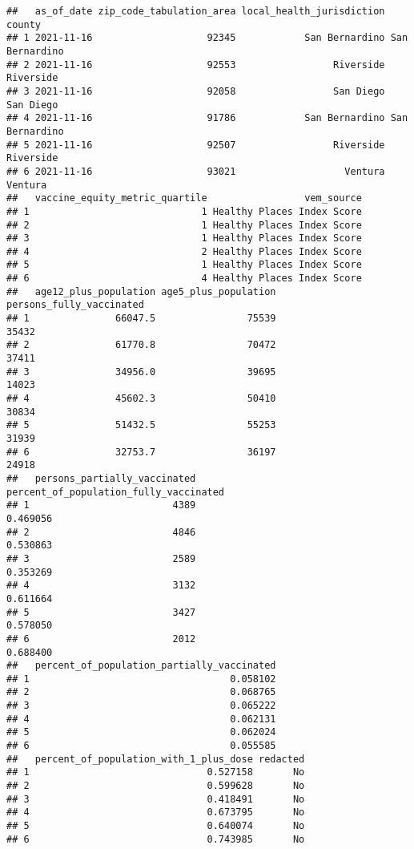 \documentclass[
]{article}
\begin{document}
\begin{verbatim}
##   as_of_date zip_code_tabulation_area local_health_jurisdiction         county
## 1 2021-11-16                    92345            San Bernardino San Bernardino
## 2 2021-11-16                    92553                 Riverside      Riverside
## 3 2021-11-16                    92058                 San Diego      San Diego
## 4 2021-11-16                    91786            San Bernardino San Bernardino
## 5 2021-11-16                    92507                 Riverside      Riverside
## 6 2021-11-16                    93021                   Ventura        Ventura
##   vaccine_equity_metric_quartile                 vem_source
## 1                              1 Healthy Places Index Score
## 2                              1 Healthy Places Index Score
## 3                              1 Healthy Places Index Score
## 4                              2 Healthy Places Index Score
## 5                              1 Healthy Places Index Score
## 6                              4 Healthy Places Index Score
##   age12_plus_population age5_plus_population persons_fully_vaccinated
## 1               66047.5                75539                    35432
## 2               61770.8                70472                    37411
## 3               34956.0                39695                    14023
## 4               45602.3                50410                    30834
## 5               51432.5                55253                    31939
## 6               32753.7                36197                    24918
##   persons_partially_vaccinated percent_of_population_fully_vaccinated
## 1                         4389                               0.469056
## 2                         4846                               0.530863
## 3                         2589                               0.353269
## 4                         3132                               0.611664
## 5                         3427                               0.578050
## 6                         2012                               0.688400
##   percent_of_population_partially_vaccinated
## 1                                   0.058102
## 2                                   0.068765
## 3                                   0.065222
## 4                                   0.062131
## 5                                   0.062024
## 6                                   0.055585
##   percent_of_population_with_1_plus_dose redacted
## 1                               0.527158       No
## 2                               0.599628       No
## 3                               0.418491       No
## 4                               0.673795       No
## 5                               0.640074       No
## 6                               0.743985       No
\end{verbatim}
\end{document}
